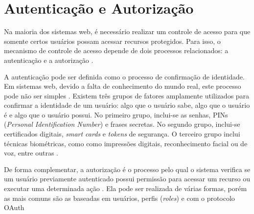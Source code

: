 \section{Autenticação e Autorização}

Na maioria dos sistemas web, é necessário realizar um controle de acesso para que somente
certos usuários possam acessar recursos protegidos. Para isso, o mecanismo  de controle de
acesso depende de dois processos relacionados: a autenticação e a autorização
\cite{SULLIVAN2011}.

A autenticação pode ser definida como o processo de confirmação de identidade. Em sistemas web,
devido a falta de conhecimento do mundo real, este processo pode não ser simples
\cite{CHAPMAN2012}. Existem três grupos de fatores amplamente utilizados para confirmar a
identidade de um usuário: algo que o usuário sabe, algo que o usuário é e algo que o usuário
possui. No primeiro grupo, inclui-se as senhas, PINs (\emph{Personal Identification Number}) e
frases secretas. No segundo grupo, inclui-se certificados digitais, \emph{smart cards} e
\emph{tokens} de segurança. O terceiro grupo inclui técnicas biométricas, como como impressões
digitais, reconhecimento facial ou de voz, entre outras \cite{SULLIVAN2011}.

De forma complementar, a autorização é o processo pelo qual o sistema verifica se um usuário 
previamente autenticado possui permissão para acessar um recurso ou executar uma determinada ação 
\cite{SPILCA2020}. Ela pode ser realizada de várias formas, porém as mais comuns são as baseadas em 
usuários, perfis (\emph{roles}) e com o protocolo OAuth \cite{CHAPMAN2012}
